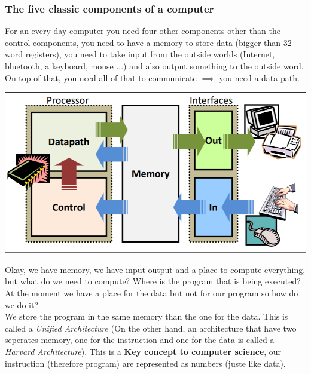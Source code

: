 \subsubsection{The five classic components of a computer}
For an every day computer you need four other components other than the control components, you need to have a memory to store data (bigger than 32 word registers), you need to take input from the outside worlds (Internet, bluetooth, a keyboard, mouse ...) and also output something to the outside word.  On top of that, you need all of that to communicate $\implies$ you need a data path.
\begin{center}
\includegraphics[scale=0.3]{screenshots/2025-10-11_4.png}
\end{center}
Okay, we have memory, we have input output and a place to compute everything, but what do we need to compute? Where is the program that is being executed? At the moment we have a place for the data but not for our program so how do we do it? \\ 
We store the program in the same memory than the one for the data. This is called a \textit{Unified Architecture} (On the other hand, an architecture that have two seperates memory, one for the instruction and one for the data is called a \textit{Harvard Architecture}). This is a \textbf{Key concept to computer science}, our instruction (therefore program) are represented as numbers (juste like data).
